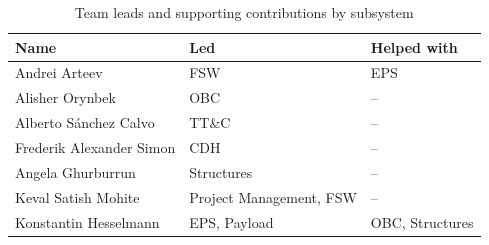 \begin{table}[H]
\centering
\begin{tabular}{lll}
\toprule
\textbf{Name} & \textbf{Led} & \textbf{Helped with} \\
\midrule
Andrei Arteev & FSW & EPS \\
Alisher Orynbek & OBC & -- \\
Alberto S\'anchez Calvo & TT\&C & -- \\
Frederik Alexander Simon & CDH & -- \\
Angela Ghurburrun & Structures & -- \\
Keval Satish Mohite & Project Management, FSW & -- \\
Konstantin Hesselmann & EPS, Payload & OBC, Structures \\
\bottomrule
\end{tabular}
\caption{Team leads and supporting contributions by subsystem}
\end{table}
